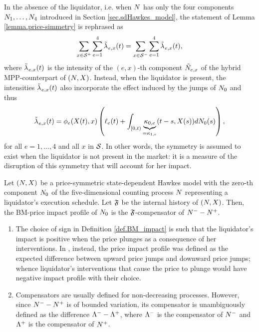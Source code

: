\documentclass[10pt, article,table]{article}
\begin{document}
 In the absence of the liquidator, i.e. when $\multiCountingProc$ has only the four components $\countingProc[1], \dots, \countingProc[4]$ introduced in Section \ref{sec.sdHawkes_model}, the statement of Lemma \ref{lemma.price-simmetry} is rephrased as 
 \begin{equation*}
  \sum_{x\in\inflationarySpace}\sum_{e=1}^{4}\hybridIntensity_{e,x}(t)
  =
  \sum_{x\in\deflationarySpace}\sum_{e=1}^{4}\hybridIntensity_{e,x}(t),
 \end{equation*}
where $\hybridIntensity_{e,x}(t)$ is the intensity of the $(e,x)$-th component $\hybridHawkes_{e,x}$ of the hybrid MPP-counterpart of $\sdHawkesPair$. Instead, when the liquidator is present, the intensities $\hybridIntensity_{e,x}(t)$ also incorporate the effect  induced by the jumps of $\countingProc[0]$ and thus 
\begin{equation*}
 \hybridIntensity_{e,x}(t) = \transProb_e(\stateVariable(t),x)
 \left(\ell_{e}(t) + \int_{[0,t)}\underbrace{\hawkesKernel_{0,e}}_{=\hawkesKernel_{1,e}}(t-s,\stateVariable(s))d\countingProc[0](s)
 \right),
\end{equation*}
for all $e=1,\dots,4$ and all $x$ in $\stateSpace$. 
In other words, the symmetry is assumed to exist when the liquidator is not present in the market: it is a measure of the disruption of this symmetry that will account for her impact.

\begin{defi}\label{def.BM_impact}
 Let $\sdHawkesPair$ be a price-symmetric state-dependent Hawkes model with the zero-th component $\countingProc[0]$ of the five-dimensional counting process $\multiCountingProc$ representing a liquidator's execution schedule. Let $\internalHistory$ be the internal history of $\sdHawkesPair$. Then, the BM-price impact profile of $\countingProc[0]$ is the $\internalHistory$-compensator of $\Nminus - \Nplus$. 
\end{defi}

\begin{remark}
\begin{enumerate}[label=\roman{*}.]
 \item 
 The choice of sign in Definition \ref{def.BM_impact} is such that the liquidator's impact is positive when the price plunges as a consequence of her interventions. In \citealp{BM14haw}, instead, the price impact profile was defined as the expected difference between upward price jumps and downward price jumps; whence liquidator's interventions that cause the price to plunge would have negative impact profile with their choice. 
 \item 
 Compensators are usually defined for non-decreasing processes. However, since $\countingProc[]^{-} - \countingProc[]^{+}$ is of bounded variation, its compensator is unambiguously defined as the difference $\compensator^{-}-\compensator^{+}$, where $\compensator^{-}$ is the compensator of $\Nminus$ and $\compensator^{+}$ is the compensator of $\Nplus$.
\end{enumerate}
\end{remark}
\end{document}
